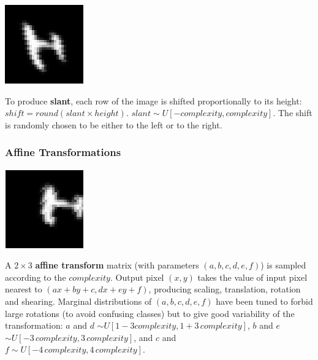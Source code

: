 \documentclass{article} %
\begin{document}
\begin{minipage}[b]{0.14\linewidth}
\centering
\includegraphics[scale=.4]{images/Slant_only.png}\\
\end{minipage}%
\hspace{0.3cm}
\begin{minipage}[b]{0.83\linewidth}
To produce {\bf slant}, each row of the image is shifted
proportionally to its height: $shift = round(slant \times height)$.  
$slant \sim U[-complexity,complexity]$.
The shift is randomly chosen to be either to the left or to the right.
\vspace{5mm}
\end{minipage}


\subsubsection*{Affine Transformations}

\begin{minipage}[b]{0.14\linewidth}
\begin{center}
\includegraphics[scale=.4]{images/Affine_only.png}
\vspace*{6mm}
\end{center}
\end{minipage}%
\hspace{0.3cm}\begin{minipage}[b]{0.86\linewidth}
\noindent A $2 \times 3$ {\bf affine transform} matrix (with
parameters $(a,b,c,d,e,f)$) is sampled according to the $complexity$.
Output pixel $(x,y)$ takes the value of input pixel
nearest to $(ax+by+c,dx+ey+f)$,
producing scaling, translation, rotation and shearing.
Marginal distributions of $(a,b,c,d,e,f)$ have been tuned to
forbid large rotations (to avoid confusing classes) but to give good
variability of the transformation: $a$ and $d$ $\sim U[1-3
complexity,1+3\,complexity]$, $b$ and $e$ $\sim U[-3 \,complexity,3\,
complexity]$, and $c$ and $f \sim U[-4 \,complexity, 4 \,
complexity]$.\\
\end{minipage}
\end{document}

